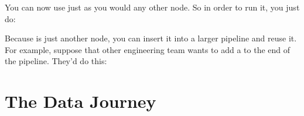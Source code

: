 \documentclass[letterpaper,10pt,english]{sphinxmanual}
\begin{document}
%
\begin{sphinxVerbatim}[commandchars=\\\{\}]
   
  
\end{sphinxVerbatim}

You can now use  just as you would any other node. So in
order to run it, you just do:

%
\begin{sphinxVerbatim}[commandchars=\\\{\}]
\end{sphinxVerbatim}

Because  is just another node, you can insert it into a
larger pipeline and reuse it. For example, suppose that other
engineering team wants to add a  to the end of the
pipeline. They’d do this:

%
\begin{sphinxVerbatim}[commandchars=\\\{\}]
  
  
\end{sphinxVerbatim}


\chapter{The Data Journey}
\label{\detokenize{data_journey:the-data-journey}}\label{\detokenize{data_journey::doc}}
\end{document}
